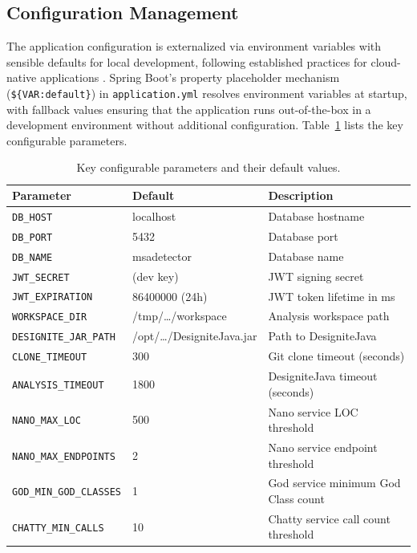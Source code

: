 \subsection{Configuration Management}
\label{subsec:config-management}

\par The application configuration is externalized via environment variables with sensible defaults for local development, following established practices for cloud-native applications \cite{Newman2015}. Spring Boot's property placeholder mechanism (\texttt{\$\{VAR:default\}}) in \texttt{application.yml} resolves environment variables at startup, with fallback values ensuring that the application runs out-of-the-box in a development environment without additional configuration. Table~\ref{tab:config-params} lists the key configurable parameters.

\begin{table}[htbp]
    \centering
    \footnotesize
    \begin{tabular}{|l|l|p{4.5cm}|}
        \hline
        \textbf{Parameter} & \textbf{Default} & \textbf{Description} \\
        \hline\hline
        \texttt{DB\_HOST} & localhost & Database hostname \\
        \hline
        \texttt{DB\_PORT} & 5432 & Database port \\
        \hline
        \texttt{DB\_NAME} & msadetector & Database name \\
        \hline
        \texttt{JWT\_SECRET} & (dev key) & JWT signing secret \\
        \hline
        \texttt{JWT\_EXPIRATION} & 86400000 (24h) & JWT token lifetime in ms \\
        \hline
        \texttt{WORKSPACE\_DIR} & /tmp/\ldots/workspace & Analysis workspace path \\
        \hline
        \texttt{DESIGNITE\_JAR\_PATH} & /opt/\ldots/DesigniteJava.jar & Path to DesigniteJava \\
        \hline
        \texttt{CLONE\_TIMEOUT} & 300 & Git clone timeout (seconds) \\
        \hline
        \texttt{ANALYSIS\_TIMEOUT} & 1800 & DesigniteJava timeout (seconds) \\
        \hline
        \texttt{NANO\_MAX\_LOC} & 500 & Nano service LOC threshold \\
        \hline
        \texttt{NANO\_MAX\_ENDPOINTS} & 2 & Nano service endpoint threshold \\
        \hline
        \texttt{GOD\_MIN\_GOD\_CLASSES} & 1 & God service minimum God Class count \\
        \hline
        \texttt{CHATTY\_MIN\_CALLS} & 10 & Chatty service call count threshold \\
        \hline
    \end{tabular}
    \caption{Key configurable parameters and their default values.}
    \label{tab:config-params}
\end{table}

